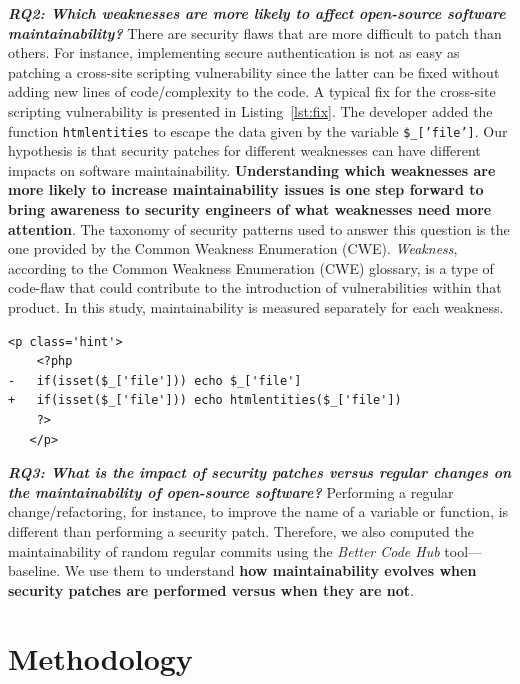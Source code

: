 \documentclass[smallextended]{svjour3}       %
\newcounter{lstannotation}
\begin{document}
\textit{\textbf{RQ2: Which weaknesses are more likely to
affect open-source software maintainability?}} There are security 
flaws that are more difficult to patch than others. For instance, 
implementing secure authentication is not as easy as patching a
cross-site scripting vulnerability since the latter can be fixed
without adding new lines of code/complexity to the code. A typical 
fix for the cross-site scripting vulnerability is presented in 
Listing~\ref{lst:fix}. The developer added the function 
\texttt{htmlentities} to escape the data given by the variable
\texttt{\$\_['file']}. Our hypothesis
is that security patches for different weaknesses can have different 
impacts on software maintainability. \textbf{Understanding which weaknesses are more 
likely to increase maintainability issues is one step forward to 
bring awareness to security engineers of what weaknesses need more 
attention}. The taxonomy of security patterns used to answer this 
question is the one provided by the Common Weakness Enumeration
(CWE). \emph{Weakness}, according to the Common Weakness Enumeration 
(CWE) glossary, is a type of code-flaw that could contribute to the 
introduction of vulnerabilities within that product. In this study, maintainability 
is measured separately for each weakness.
%
\setcounter{lstannotation}{0}
\begin{lstlisting}[style={PHPStyle}, caption={Fix provided by \texttt{nextcloud/server} developers to a Cross-Site Scripting vulnerability},label={lst:fix}]
   <p class='hint'>
    <?php
-   if(isset($_['file'])) echo $_['file']
+   if(isset($_['file'])) echo htmlentities($_['file'])
    ?>
   </p>
\end{lstlisting}
%
\textit{\textbf{RQ3: What is the impact of security patches versus 
regular changes on the maintainability of open-source software?}}
%
Performing a regular change/refactoring, for instance, to improve the name of 
a variable or function, is different than performing a security patch.
Therefore, we also computed the maintainability of random regular commits using 
the \emph{Better Code Hub} tool---baseline. We use them to 
understand \textbf{how maintainability evolves when security patches 
are performed versus when they are not}.
%
\section{Methodology}\label{sec:methodology}
%
\end{document}
